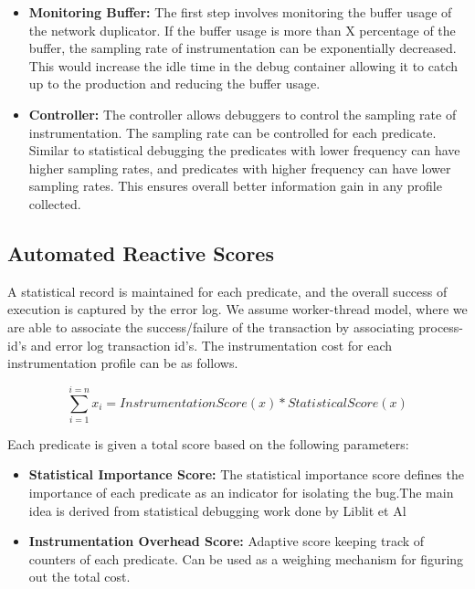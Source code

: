 \begin{itemize}
	\item \textbf{Monitoring Buffer:}
	The first step involves monitoring the buffer usage of the network duplicator. 
	If the buffer usage is more than X percentage of the buffer, the sampling rate of instrumentation can be exponentially decreased.
	This would increase the idle time in the debug container allowing it to catch up to the production and reducing the buffer usage.
	
	\item \textbf{Controller:}
	The controller allows debuggers to control the sampling rate of instrumentation.
	The sampling rate can be controlled for each predicate.
	Similar to statistical debugging the predicates with lower frequency can have higher sampling rates, and predicates with higher frequency can have lower sampling rates. This ensures overall better information gain in any profile collected.  	
	
\end{itemize}

\subsection{Automated Reactive Scores}

A statistical record is maintained for each predicate, and the overall success of execution is captured by the error log.
We assume worker-thread model, where we are able to associate the success/failure of the transaction by associating process-id’s and error log transaction id’s.
The instrumentation cost for each instrumentation profile can be as follows.

\begin{equation}
\sum\limits_{i=1}^{i=n} x_i  = InstrumentationScore(x)*StatisticalScore(x)
\end{equation}

Each predicate is given a total score based on the following parameters:

\begin{itemize}
	\item \textbf{Statistical Importance Score:} The statistical importance score defines the importance of each predicate as an indicator for isolating the bug.The main idea is derived from statistical debugging work done by Liblit et Al
	\item \textbf{Instrumentation Overhead Score:} Adaptive score keeping track of counters of each predicate. Can be used as a weighing mechanism for figuring out the total cost.
\end{itemize}


